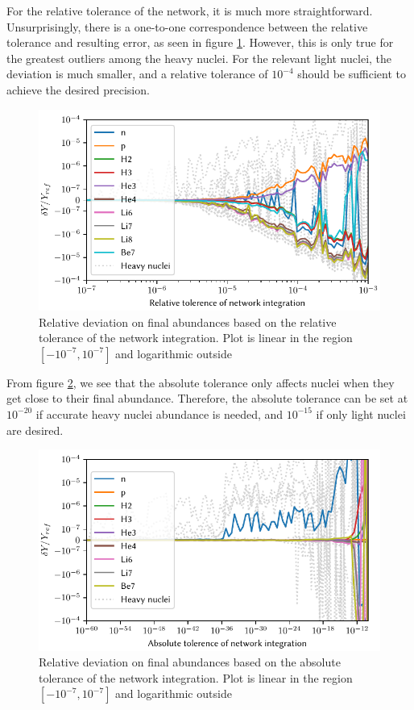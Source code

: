 For the relative tolerance of the network, it is much more straightforward. Unsurprisingly, there is a one-to-one correspondence between the relative tolerance and resulting error, as seen in figure \ref{fig:rtolnet}. However, this is only true for the greatest outliers among the heavy nuclei. For the relevant light nuclei, the deviation is much smaller, and a relative tolerance of $10^{-4}$ should be sufficient to achieve the desired precision. 
\begin{figure}[ht]
    \includegraphics[width=5.1in]{figures/rtolnet.pdf}
    \caption{Relative deviation on final abundances based on the relative tolerance of the network integration. Plot is linear in the region $[-10^{-7},10^{-7}]$ and logarithmic outside}
    \label{fig:rtolnet}
\end{figure}


From figure \ref{fig:atolnet}, we see that the absolute tolerance only affects nuclei when they get close to their final abundance. Therefore, the absolute tolerance can be set at $10^{-20}$ if accurate heavy nuclei abundance is needed, and $10^{-15}$ if only light nuclei are desired.
\begin{figure}[ht]
    \includegraphics[width=5.1in]{figures/atolnet.pdf}
    \caption{Relative deviation on final abundances based on the absolute tolerance of the network integration. Plot is linear in the region $[-10^{-7},10^{-7}]$ and logarithmic outside}
    \label{fig:atolnet}
\end{figure}



